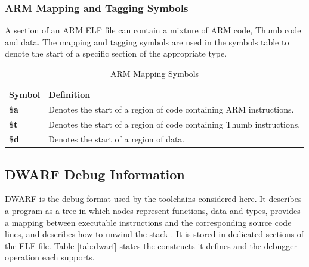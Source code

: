 \subsubsection{ARM Mapping and Tagging Symbols}
\label{subsec:mapping_symbols}
A section of an ARM ELF file can contain a mixture of ARM code, Thumb code and data. The mapping and tagging symbols are used in the symbols table to denote the start of a specific section of the appropriate type.

\begin{table}[H]
    \centering
    \caption{ARM Mapping Symbols}
    \label{tab:arm_map_tag}
    \begin{tabularx}{\linewidth}{| @{}>{\hsize\bfseries}Y | >{\hsize}Y@{} |}
        \hline
        Symbol & \textbf{Definition} \\
        \hline
        \$a & Denotes the start of a region of code containing ARM instructions. \\
        \hline
        \$t & Denotes the start of a region of code containing Thumb instructions. \\
        \hline
        \$d & Denotes the start of a region of data.\\
        \hline
    \end{tabularx}
\end{table}

\subsection{DWARF Debug Information}
\label{subsec:dwarf}
DWARF is the debug format used by the toolchains considered here. It describes a program as a tree in which nodes represent functions, data and types, provides a mapping between executable instructions and the corresponding source code lines, and describes how to unwind the stack \cite{markusson2008}. It is stored in dedicated sections of the ELF file. Table \ref{tab:dwarf} states the constructs it defines and the debugger operation each supports.

